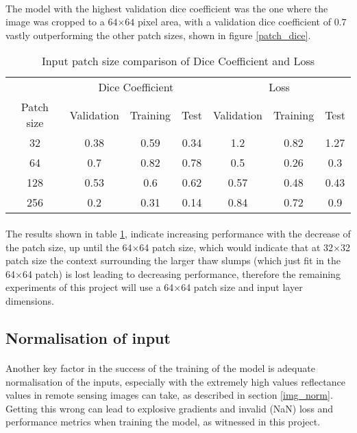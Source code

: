 \paragraph{}
The model with the highest validation dice coefficient was the one where the image was cropped to a $64$×$64$ pixel area, with a validation dice coefficient of $0.7$ vastly outperforming the other patch sizes, shown in figure \ref{patch_dice}.
\begin{table}[ht!] 
    \begin{center}
    \begin{tabular}{ccccccc} 
    \toprule
       & \multicolumn{3}{c}{Dice Coefficient}     & \multicolumn{3}{c}{Loss} \\
    Patch size & Validation & Training & Test & Validation    & Training    & Test   \\ \midrule
32 & 0.38 & 0.59 & 0.34 & 1.2 & 0.82 & 1.27 \\ \rowcolor{lightgray} 64 & 0.7 & 0.82 & 0.78 & 0.5 & 0.26 & 0.3  \\ 128 & 0.53 & 0.6 & 0.62 & 0.57 & 0.48 & 0.43  \\ 256 & 0.2 & 0.31 & 0.14 & 0.84 & 0.72 & 0.9  \\
\bottomrule
    \end{tabular}
  \end{center} 
  \caption{Input patch size comparison of Dice Coefficient and Loss}\label{tab_patch}
\end{table}
\paragraph{}
The results shown in table \ref{tab_patch}, indicate increasing performance with the decrease of the patch size, up until the 64×64 patch size, which would indicate that at 32×32 patch size the context surrounding the larger thaw slumps (which just fit in the 64×64 patch) is lost leading to decreasing performance, therefore the remaining experiments of this project will use a 64×64 patch size and input layer dimensions.
\subsection{Normalisation of input}
\paragraph{}
Another key factor in the success of the training of the model is adequate normalisation of the inputs, especially with the extremely high values reflectance values in remote sensing images can take, as described in section \ref{img_norm}. Getting this wrong can lead to explosive gradients and invalid (NaN) loss and performance metrics when training the model, as witnessed in this project.

